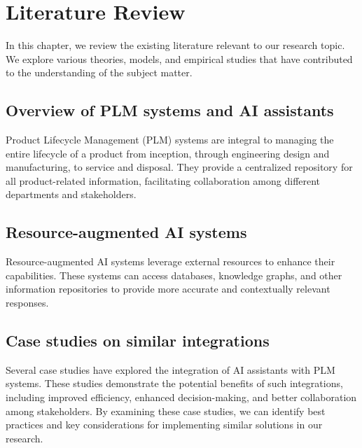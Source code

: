 \chapter{Literature Review}
\label{ch:literature-review}

In this chapter, we review the existing literature relevant to our research topic. We explore various theories, models, and empirical studies that have contributed to the understanding of the subject matter.

\section{Overview of PLM systems and AI assistants}
\label{sec:plm-systems-and-ai-assistants}

Product Lifecycle Management (PLM) systems are integral to managing the entire lifecycle of a product from inception, through engineering design and manufacturing, to service and disposal. They provide a centralized repository for all product-related information, facilitating collaboration among different departments and stakeholders.

\section{Resource-augmented AI systems}
\label{sec:resource-augmented-ai-systems}

Resource-augmented AI systems leverage external resources to enhance their capabilities. These systems can access databases, knowledge graphs, and other information repositories to provide more accurate and contextually relevant responses.

\section{Case studies on similar integrations}
\label{sec:case-studies-on-similar-integrations}

Several case studies have explored the integration of AI assistants with PLM systems. These studies demonstrate the potential benefits of such integrations, including improved efficiency, enhanced decision-making, and better collaboration among stakeholders. By examining these case studies, we can identify best practices and key considerations for implementing similar solutions in our research. \parencite{lin_generative_2025} %
